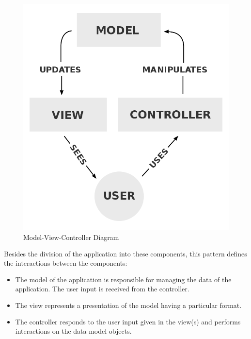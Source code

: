 \documentclass[12pt,a4paper,twoside]{report}
\begin{document}
\begin{figure}
	\centering
	\includegraphics[scale=0.2]{img/diags/MVCDiag.png}
	\caption{Model-View-Controller Diagram}
\end{figure}

Besides the division of the application into these components, this pattern defines the interactions between the components:

\begin{itemize}
	\item The model of the application is responsible for managing the data of the application. The user input is received from the controller.
	\item The view represents a presentation of the model having a particular format.
	\item The controller responds to the user input given in the view(s) and performs interactions on the data model objects.
\end{itemize}
\end{document}
